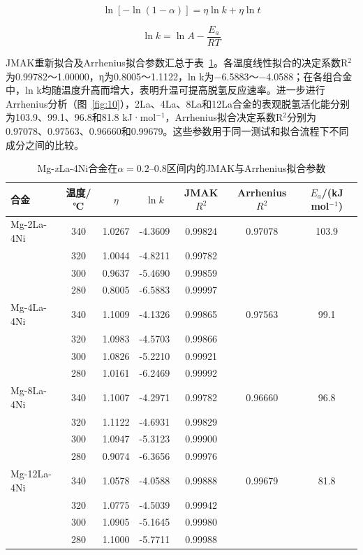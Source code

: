 \documentclass[preprint,12pt]{elsarticle}
\begin{document}
\begin{equation}\ln[-\ln(1-\alpha)]=\eta\ln k+\eta\ln t\label{eq:jmak}\end{equation}

\begin{equation}\ln k=\ln A-\frac{E_a}{RT}\label{eq:arrhenius}\end{equation}

JMAK重新拟合及Arrhenius拟合参数汇总于表~\ref{tab:5}。各温度线性拟合的决定系数R$^2$为0.99782～1.00000，η为0.8005～1.1122，ln k为−6.5883～−4.0588；在各组合金中，ln k均随温度升高而增大，表明升温可提高脱氢反应速率。进一步进行Arrhenius分析（图~\ref{fig:10}），2La、4La、8La和12La合金的表观脱氢活化能分别为103.9、99.1、96.8和81.8 kJ·mol$^{-1}$，Arrhenius拟合决定系数R$^2$分别为0.97078、0.97563、0.96660和0.99679。这些参数用于同一测试和拟合流程下不同成分之间的比较。

\begin{table}[htbp]
\centering
\caption{Mg-\textit{x}La-4Ni合金在$\alpha=0.2$--$0.8$区间内的JMAK与Arrhenius拟合参数}
\label{tab:5}
\begingroup
\fontsize{9.5}{12}\selectfont
\setlength{\tabcolsep}{3pt}
\renewcommand{\arraystretch}{1.06}
\begin{tabular}{@{}lcccccc@{}}
\toprule
合金 & 温度/℃ & $\eta$ & $\ln k$ & JMAK $R^2$ & Arrhenius $R^2$ & $E_a$/(kJ mol$^{-1}$) \\
\midrule
Mg-2La-4Ni & 340 & 1.0267 & -4.3609 & 0.99824 & 0.97078 & 103.9 \\
 & 320 & 1.0044 & -4.8211 & 0.99782 &  &  \\
 & 300 & 0.9637 & -5.4690 & 0.99859 &  &  \\
 & 280 & 0.8005 & -6.5883 & 0.99997 &  &  \\
Mg-4La-4Ni & 340 & 1.1009 & -4.1326 & 0.99865 & 0.97563 & 99.1 \\
 & 320 & 1.0983 & -4.5703 & 0.99866 &  &  \\
 & 300 & 1.0826 & -5.2210 & 0.99921 &  &  \\
 & 280 & 1.0161 & -6.2469 & 0.99992 &  &  \\
Mg-8La-4Ni & 340 & 1.1007 & -4.2971 & 0.99782 & 0.96660 & 96.8 \\
 & 320 & 1.1122 & -4.6931 & 0.99829 &  &  \\
 & 300 & 1.0947 & -5.3123 & 0.99900 &  &  \\
 & 280 & 0.9074 & -6.3656 & 0.99976 &  &  \\
Mg-12La-4Ni & 340 & 1.0578 & -4.0588 & 0.99888 & 0.99679 & 81.8 \\
 & 320 & 1.0775 & -4.5039 & 0.99942 &  &  \\
 & 300 & 1.0905 & -5.1645 & 0.99980 &  &  \\
 & 280 & 1.1000 & -5.7711 & 0.99988 &  &  \\
\bottomrule
\end{tabular}
\endgroup
\end{table}
\end{document}
